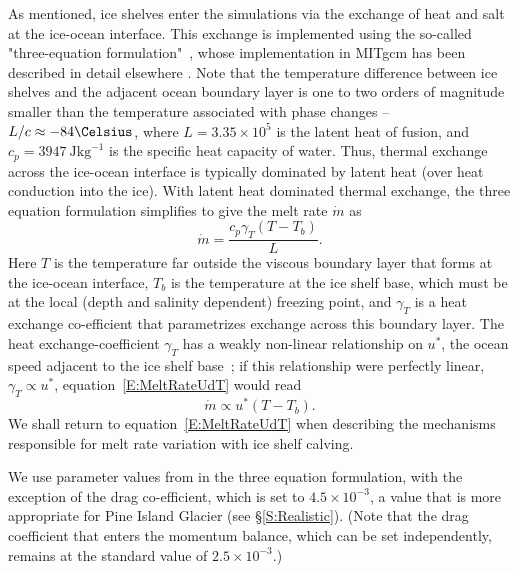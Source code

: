 \documentclass[draft]{agujournal2019}
\begin{document}
As mentioned, ice shelves enter the simulations via the exchange of heat and salt at the ice-ocean interface. This exchange is implemented using the so-called "three-equation formulation"~\cite{Holland1999JPhysOcean}, whose implementation in MITgcm has been described in detail elsewhere \cite[for example]{Losch2008JGeophysResOceans, DeRydt2014JGeophysResOceans,Dansereau2014JGROceans}. Note that the temperature difference between ice shelves and the adjacent ocean boundary layer is one to two orders of magnitude smaller than the temperature associated with phase changes -- $L/c \approx -84\si{\Celsius}$, where $L=3.35\times10^5$ is the latent heat of fusion, and $c_p=3947~\si{\joule \kilogram}^{-1}$ is the specific heat capacity of water. Thus, thermal exchange across the ice-ocean interface is typically dominated by latent heat (over heat conduction into the ice). With latent heat dominated thermal exchange, the three equation formulation simplifies to give the melt rate $\dot{m}$ as
\begin{equation}\label{E:MeltRate}
    \dot{m} = \frac{c_p \gamma_T (T - T_b)}{L}.
\end{equation}
Here $T$ is the temperature far outside the viscous boundary layer that forms at the ice-ocean interface, $T_b$ is the temperature at the ice shelf base, which must be at the local (depth and salinity dependent) freezing point, and $\gamma_T$ is a heat exchange co-efficient that parametrizes exchange across this boundary layer. The heat exchange-coefficient $\gamma_T$ has a weakly non-linear relationship on $u^*$, the ocean speed adjacent to the ice shelf base~\cite{Holland1999JPhysOcean}; if this relationship were perfectly linear, $\gamma_T \propto u^*$, equation~\eqref{E:MeltRateUdT} would read
\begin{equation}\label{E:MeltRateUdT}
    \dot{m} \propto u^* (T - T_b).
\end{equation}
We shall return to equation~\eqref{E:MeltRateUdT} when describing the mechanisms responsible for melt rate variation with ice shelf calving.

We use parameter values from  in the three equation formulation, with the exception of the drag co-efficient, which is set to $4.5\times10^{-3}$, a value that is more appropriate for Pine Island Glacier (see \S\ref{S:Realistic}). (Note that the drag coefficient that enters the momentum balance, which can be set independently, remains at the standard value of $2.5\times 10^{-3}$.)
\end{document}
